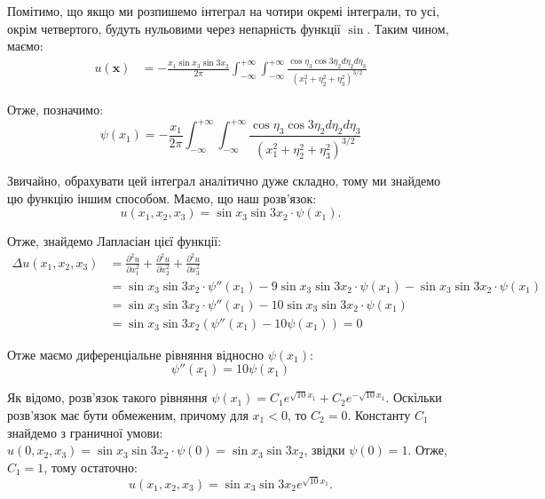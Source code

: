 \documentclass{hw_template}
\begin{document}
Помітимо, що якщо ми розпишемо інтеграл на чотири окремі інтеграли, то усі, окрім четвертого, будуть нульовими через непарність функції $\sin$. Таким чином, маємо:
\begin{align*}
    u(\mathbf{x}) &= -\frac{x_1\sin x_3 \sin 3x_2}{2\pi}\int_{-\infty}^{+\infty}\int_{-\infty}^{+\infty}\frac{\cos\eta_3\cos 3\eta_2 d\eta_2d\eta_3}{\left(x_1^2+\eta_2^2+\eta_3^2\right)^{3/2}}
\end{align*}

Отже, позначимо:
\begin{equation*}
    \psi(x_1) = -\frac{x_1}{2\pi}\int_{-\infty}^{+\infty}\int_{-\infty}^{+\infty}\frac{\cos\eta_3\cos 3\eta_2 d\eta_2d\eta_3}{\left(x_1^2+\eta_2^2+\eta_3^2\right)^{3/2}}
\end{equation*}

Звичайно, обрахувати цей інтеграл аналітично дуже складно, тому ми знайдемо цю функцію іншим способом. Маємо, що наш розв'язок:
\begin{equation*}
    u(x_1,x_2,x_3) = \sin x_3 \sin 3x_2 \cdot \psi(x_1).
\end{equation*}

Отже, знайдемо Лапласіан цієї функції:
\begin{align*}
    \Delta u(x_1,x_2,x_3) &= \frac{\partial^2 u}{\partial x_1^2} + \frac{\partial^2 u}{\partial x_2^2} + \frac{\partial^2 u}{\partial x_3^2} \\
    &= \sin x_3 \sin 3x_2 \cdot \psi''(x_1) - 9\sin x_3 \sin 3x_2 \cdot \psi(x_1) - \sin x_3 \sin 3x_2 \cdot \psi(x_1) \\
    &= \sin x_3 \sin 3x_2 \cdot \psi''(x_1) - 10\sin x_3 \sin 3x_2 \cdot \psi(x_1) \\
    &= \sin x_3 \sin 3x_2(\psi''(x_1) - 10\psi(x_1)) = 0
\end{align*}

Отже маємо диференціальне рівняння відносно $\psi(x_1)$:
\begin{equation*}
    \psi''(x_1) = 10\psi(x_1)
\end{equation*}

Як відомо, розв'язок такого рівняння $\psi(x_1) = C_1e^{\sqrt{10}x_1} + C_2e^{-\sqrt{10}x_1}$. Оскільки розв'язок має бути обмеженим, причому для $x_1<0$, то $C_2=0$. Константу $C_1$ знайдемо з граничної умови: $u(0,x_2,x_3)=\sin x_3 \sin 3x_2 \cdot \psi(0) = \sin x_3 \sin 3x_2$, звідки $\psi(0)=1$. Отже, $C_1=1$, тому остаточно:
\begin{equation*}
    \boxed{u(x_1,x_2,x_3) = \sin x_3 \sin 3x_2 e^{\sqrt{10}x_1}}.
\end{equation*}
\end{document}
